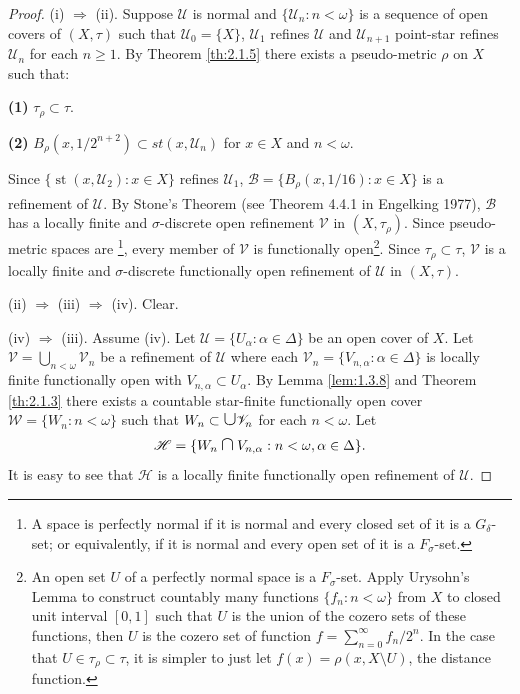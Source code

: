 \documentclass[main.tex]{subfiles}
\begin{document}
\begin{proof} (i) $\Rightarrow$ (ii).
	Suppose $\mathscr{U}$ is normal and $\{\mathscr{U}_n: n<\omega\}$ is a sequence of 
	open covers of $(X, \tau)$ such that $\mathscr{U}_0 = \{X\}$, 
	$\mathscr{U}_1$ 
	refines $\mathscr{U}$ and $\mathscr{U}_{n+1}$ point-star refines 
	$\mathscr{U}_n$ for each $n \ge 1$.
	By Theorem \ref{th:2.1.5} there exists a pseudo-metric $\rho$ on $X$ such that:
	
\textbf{(1)} $\tau_\rho \subset \tau$.
	
\textbf{(2)} $B_\rho(x, 1/{2^{n+2}}) \subset \textit{st}(x, \mathscr{U}_n)$ for $x \in X$ and $n < \omega$.
	
	\noindent Since $\{\operatorname{st}(x, \mathscr{U}_2): x \in X\}$ refines $\mathscr{U}_1$, 
	$\mathscr{B} = \{B_\rho(x, 1/{16}): x \in X\}$ is a refinement of $\mathscr{U}$. 
	By Stone's Theorem (see Theorem 4.4.1 in 
	\hstretch{1.8}{[}Engelking 1977\hstretch{1.8}{]}\textsuperscript{\cite{Engelking}}),  %
	$\mathscr{B}$ has a locally finite  and $\sigma$-discrete open refinement 
	$\mathscr{V}$ in $(X, \tau_\rho)$. Since pseudo-metric spaces are 
\footnote{A space is 
perfectly normal if it is normal and every closed set of it is a $G_\delta$-set;
or equivalently, if it is normal and every open set of it is a $F_\sigma$-set.}, 
	every member of $\mathscr{V}$ is functionally 
open\footnote{An open set $U$ of a perfectly normal space is a $F_\sigma$-set. Apply Urysohn's Lemma
to construct countably many functions $\{f_n: n < \omega\}$ from
$X$ to closed unit interval $[0,1]$ such that 
$U$ is the union of the cozero sets of these functions, then $U$ is the cozero set of function 
$f =\sum_{n = 0}^\infty f_n/2^n$. In the case that $U\in\tau_\rho \subset \tau$, it is simpler to just
let $f(x) = \rho(x, X\setminus U)$, the distance function.}. 
	Since $\tau_\rho \subset \tau$, $\mathscr{V}$ is a locally finite 
	and $\sigma$-discrete functionally open refinement of $\mathscr{U}$ in $(X, \tau)$.
	
(ii) $\Rightarrow$ (iii) $\Rightarrow$ (iv).
	Clear.
	
(iv) $\Rightarrow$ (iii). 
	Assume (iv). Let $\mathscr{U} = \{U_\alpha: \alpha \in \Delta\}$ be an open cover of $X$. 
	Let $\mathscr{V} = \bigcup_{n < \omega} \mathscr{V}_n$ be 
	a refinement of $\mathscr{U}$ where each $\mathscr{V}_n = \{V_{n,\alpha}: \alpha \in \Delta\}$
	is locally finite functionally open with $V_{n,\alpha} \subset U_\alpha$.
	By Lemma \ref{lem:1.3.8} and Theorem \ref{th:2.1.3} 
	there exists a countable star-finite functionally open cover 
	$\mathscr{W} = \{W_n: n < \omega\}$ such that 
	$W_n\subset \mathbin{\scalebox{1.4}{$\cup$}}\mathscr{V}_n$ for each $n<\omega$.
Let
\begin{gather}
	\mathscr{H} = \{W_n \mathbin{\scalebox{1.4}{$\cap$}} V_{n, \alpha}: 
	n < \omega, \alpha \in \Delta\}. \label{eq:2.1.6.1}
\end{gather}
It is easy to see that $\mathscr{H}$ is a locally finite 
	functionally open refinement of $\mathscr{U}$.
	

\end{proof}
\end{document}
